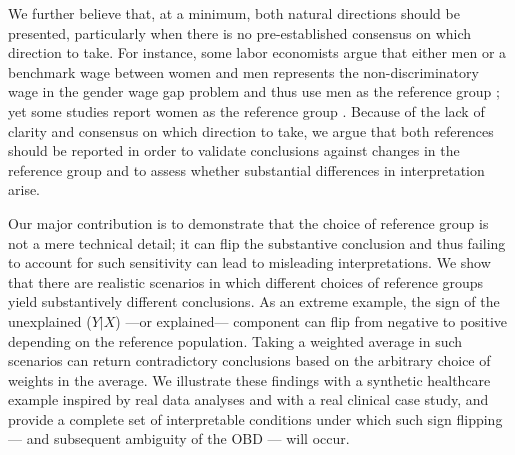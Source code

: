 We further believe that, at a minimum, both natural directions should be presented, particularly when there is no pre-established consensus on which direction to take.  
For instance, some labor economists argue that either men or a benchmark wage between women and men represents the non-discriminatory wage in the gender wage gap problem and thus use men as the reference group \citep{oaxaca1973,blinder1973, fortinLemieuxFirpo2011}; yet some studies report women as the reference group \citep{paradaContzen2025}. 
Because of the lack of clarity and consensus on which direction to take, we argue that both references should be reported in order to validate conclusions against changes in the reference group and to assess whether substantial differences in interpretation arise.


Our major contribution is to demonstrate that the choice of reference group is not a mere technical detail; it can flip the substantive conclusion and thus failing to account for such sensitivity can lead to misleading interpretations.
We show that there are realistic scenarios in which different choices of reference groups yield substantively different conclusions.
As an extreme example, the sign of the unexplained ($Y|X$) ---or explained--- component can flip from negative to positive depending on the reference population.
Taking a weighted average in such scenarios can return contradictory conclusions based on the arbitrary choice of weights in the average.
We illustrate these findings with a synthetic healthcare example inspired by real data analyses and with a real clinical case study, and provide a complete set of interpretable conditions under which such sign flipping --- and subsequent ambiguity of the OBD --- will occur.

